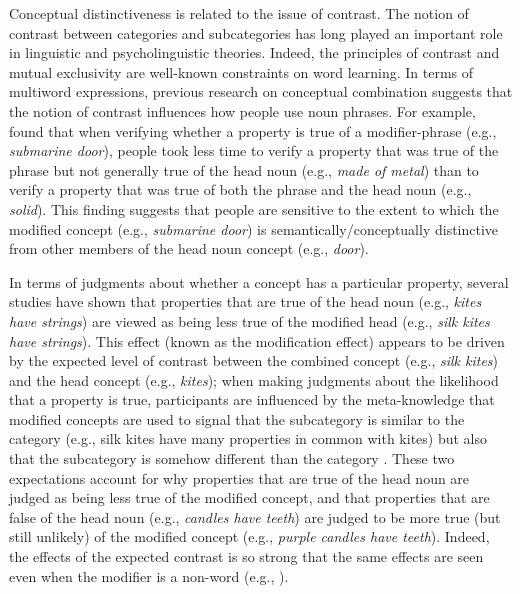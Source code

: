 \documentclass[output=paper]{langsci/langscibook}
\begin{document}
Conceptual distinctiveness is related to the issue of contrast. The
notion of contrast between categories and subcategories has long
played an important role in linguistic and psycholinguistic
theories. Indeed, the principles of contrast and mutual exclusivity \citep{clark1983lexicon,carstairs2010evolution} are well-known constraints on
word learning. In terms of multiword expressions, previous research on
conceptual combination suggests that the notion of contrast influences
how people use noun phrases. For example, \citet{gagne1996influence}
found that when verifying whether a property is true of a
modifier-phrase (e.g., \textit{submarine door}), people took less time
to verify a property that was true of the phrase but not generally
true of the head noun (e.g., \textit{made of metal}) than to verify a
property that was true of both the phrase and the head noun (e.g.,
\textit{solid}). This finding suggests that people are sensitive to
the extent to which the modified concept (e.g., \textit{submarine
  door}) is semantically/conceptually distinctive from other members
of the head noun concept (e.g., \textit{door}).

In terms of judgments about whether a concept has a particular
property, several studies \citep{connolly2007stereotypes,gagne2011inferential,hampton2011modifier,jonsson2012modifier,gagne2014subcategorisation} have shown that properties that are true of
the head noun (e.g., \textit{kites have strings}) are viewed as being
less true of the modified head (e.g., \textit{silk kites have
  strings}). This effect (known as the modification effect) appears to
be driven by the expected level of contrast between the combined
concept (e.g., \textit{silk kites}) and the head concept (e.g.,
\textit{kites}); when making judgments about the likelihood that a
property is true, participants are influenced by the meta-knowledge
that modified concepts are used to signal that the subcategory is
similar to the category (e.g., silk kites have many properties in
common with kites) but also that the subcategory is somehow different
than the category \citep{gagne2011inferential,gagne2014subcategorisation,spalding2015property}. These two expectations account for why
properties that are true of the head noun are judged as being less
true of the modified concept, and that properties that are false of
the head noun (e.g., \textit{candles have teeth}) are judged to be
more true (but still unlikely) of the modified concept (e.g.,
\textit{purple candles have teeth}). Indeed, the effects of the
expected contrast is so strong that the same effects are seen even
when the modifier is a non-word (e.g., \citealt{gagne2015semantics}).
\end{document}
